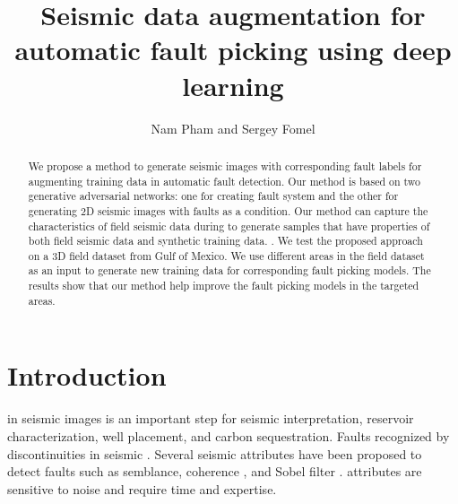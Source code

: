 
\title{Seismic data augmentation for automatic fault picking using deep learning}
\author{Nam Pham and Sergey Fomel}
\address{The University of Texas at Austin,\\
John A. and Katherine G. Jackson School of Geosciences,\\ Bureau of Economic Geology,\\
Austin, Texas, USA}


\maketitle

\begin{abstract}
	We propose a method to generate seismic images with corresponding fault labels for augmenting training data in automatic fault detection. Our method is based on two generative adversarial networks: one for creating fault system and the other for generating 2D seismic images with faults as a condition. Our method can capture the characteristics of field seismic data during  to generate samples that have properties of both field seismic data and synthetic training data. .  We test the proposed approach on a 3D field dataset from  Gulf of Mexico. We use different areas in the field dataset as an input to generate new training data for corresponding fault picking models. The results show that  our method help improve the fault picking models in the targeted areas.  
\end{abstract}

\section{Introduction}
 in seismic images is an important step for seismic interpretation, reservoir characterization, well placement, and carbon sequestration. Faults  recognized by discontinuities in seismic . Several seismic attributes have been proposed to detect faults such as semblance, coherence \cite[]{marfurt1998,gersztenkorn1999,chopra2007,kington2015,karimi2015,wu2017,wu2018}, and Sobel filter \cite[]{sobel1968,phillips2017}.  attributes are sensitive to noise and require time and expertise.

